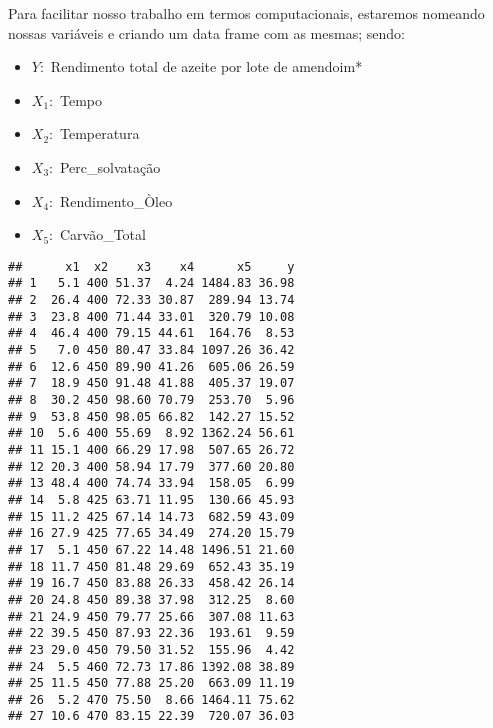 \documentclass[
]{article}
\newenvironment{Shaded}{\begin{snugshade}}{\end{snugshade}}
\newcommand{\FunctionTok}[1]{\textcolor[rgb]{0.00,0.00,0.00}{#1}}
\newcommand{\NormalTok}[1]{#1}
\newcommand{\OtherTok}[1]{\textcolor[rgb]{0.56,0.35,0.01}{#1}}
\newcommand{\SpecialCharTok}[1]{\textcolor[rgb]{0.00,0.00,0.00}{#1}}
\begin{document}
Para facilitar nosso trabalho em termos computacionais, estaremos
nomeando nossas variáveis e criando um data frame com as mesmas; sendo:

\begin{itemize}
\item
  \(Y:\) Rendimento total de azeite por lote de amendoim*
\item
  \(X_1:\) Tempo
\item
  \(X_2:\) Temperatura
\item
  \(X_3:\) Perc\_solvatação
\item
  \(X_4:\) Rendimento\_Òleo
\item
  \(X_5:\) Carvão\_Total
\end{itemize}

\begin{Shaded}
\end{Shaded}

\begin{verbatim}
##      x1  x2    x3    x4      x5     y
## 1   5.1 400 51.37  4.24 1484.83 36.98
## 2  26.4 400 72.33 30.87  289.94 13.74
## 3  23.8 400 71.44 33.01  320.79 10.08
## 4  46.4 400 79.15 44.61  164.76  8.53
## 5   7.0 450 80.47 33.84 1097.26 36.42
## 6  12.6 450 89.90 41.26  605.06 26.59
## 7  18.9 450 91.48 41.88  405.37 19.07
## 8  30.2 450 98.60 70.79  253.70  5.96
## 9  53.8 450 98.05 66.82  142.27 15.52
## 10  5.6 400 55.69  8.92 1362.24 56.61
## 11 15.1 400 66.29 17.98  507.65 26.72
## 12 20.3 400 58.94 17.79  377.60 20.80
## 13 48.4 400 74.74 33.94  158.05  6.99
## 14  5.8 425 63.71 11.95  130.66 45.93
## 15 11.2 425 67.14 14.73  682.59 43.09
## 16 27.9 425 77.65 34.49  274.20 15.79
## 17  5.1 450 67.22 14.48 1496.51 21.60
## 18 11.7 450 81.48 29.69  652.43 35.19
## 19 16.7 450 83.88 26.33  458.42 26.14
## 20 24.8 450 89.38 37.98  312.25  8.60
## 21 24.9 450 79.77 25.66  307.08 11.63
## 22 39.5 450 87.93 22.36  193.61  9.59
## 23 29.0 450 79.50 31.52  155.96  4.42
## 24  5.5 460 72.73 17.86 1392.08 38.89
## 25 11.5 450 77.88 25.20  663.09 11.19
## 26  5.2 470 75.50  8.66 1464.11 75.62
## 27 10.6 470 83.15 22.39  720.07 36.03
\end{verbatim}
\end{document}
